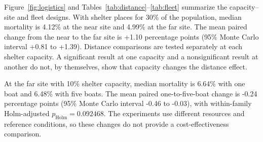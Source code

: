 Figure~\ref{fig:logistics} and Tables~\ref{tab:distance}--\ref{tab:fleet} summarize the capacity--site and fleet designs. With shelter places for 30\% of the population, median mortality is 4.12\% at the near site and 4.99\% at the far site. The mean paired change from the near to the far site is +1.10 percentage points (95\% Monte Carlo interval +0.81 to +1.39). Distance comparisons are tested separately at each shelter capacity. A significant result at one capacity and a nonsignificant result at another do not, by themselves, show that capacity changes the distance effect.

At the far site with 10\% shelter capacity, median mortality is 6.64\% with one boat and 6.48\% with five boats. The mean paired one-to-five-boat change is -0.24 percentage points (95\% Monte Carlo interval -0.46 to -0.03), with within-family Holm-adjusted $p_{\mathrm{Holm}}=0.092468$. The experiments use different resources and reference conditions, so these changes do not provide a cost-effectiveness comparison.
